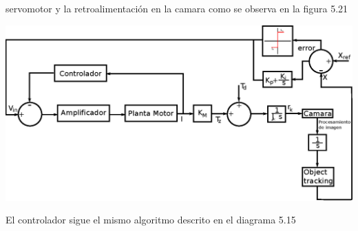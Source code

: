 servomotor y la retroalimentación en la camara como se observa en la figura 5.21
\begin{center}
	\includegraphics[width=1.0\textwidth]{Contenido/Cuerpo/Capitulo5/Fig34.eps}
	\label{Fig4}
\end{center}
El controlador sigue el mismo algoritmo descrito en el diagrama 5.15

